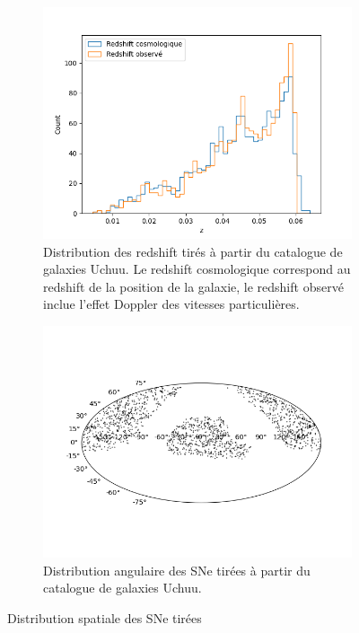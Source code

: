 \documentclass{book}
\begin{document}
\begin{figure}
	\centering
	\begin{subfigure}[c]{0.45\textwidth}
		\includegraphics[width=\textwidth]{figures/redshift_draw.png}
		\caption{Distribution des redshift tirés à partir du catalogue de galaxies Uchuu. Le redshift cosmologique correspond au redshift de la position de la galaxie, le redshift observé inclue l'effet Doppler des vitesses particulières.}
		\label{fig:z_draw}
	\end{subfigure}
	\hfill
	\begin{subfigure}[c]{0.5\textwidth}
		\centering
		\includegraphics[width=\textwidth, trim={1cm 2.5cm 1cm 2.5cm}, clip]{figures/angular_draw.png}
		\caption{Distribution angulaire des SNe tirées à partir du catalogue de galaxies Uchuu.}
		\label{fig:ang_draw}
	\end{subfigure}
	
	\caption{Distribution spatiale des SNe tirées}
\end{figure}
\end{document}

